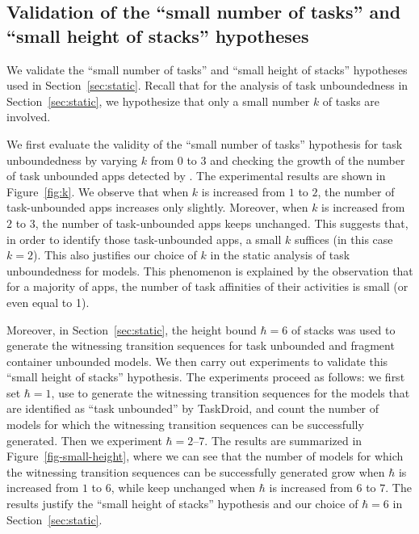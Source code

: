 
\subsection{Validation of the  ``small number of tasks''  and ``small height of stacks''  hypotheses} \label{sec:hyp}

We validate the ``small number of tasks''  and ``small height of stacks''  hypotheses used in Section~\ref{sec:static}.
%
Recall that for the analysis of task unboundedness in Section~\ref{sec:static},  we hypothesize that only a small number $k$ of tasks are involved. 

We first evaluate the validity of the ``small number of tasks'' hypothesis for task unboundedness by varying  $k$ from $0$ to $3$ and checking the growth of the number of task unbounded apps detected by {\tool}. 
The experimental results are shown in Figure~\ref{fig:k}.
We observe that when $k$ is increased from $1$ to $2$, the number of task-unbounded apps increases only slightly.
Moreover, when $k$ is increased from $2$ to $3$, the number of task-unbounded apps keeps unchanged.
This suggests that, in order to identify those task-unbounded apps, a small $k$ suffices (in this case $k=2$). This also justifies our choice of $k$ in the static analysis of task unboundedness for {\AMASS} models.  This phenomenon is explained by the observation that for a majority of apps, %
the number of task affinities of their activities is small (or even equal to 1).
%

Moreover, in Section~\ref{sec:static}, the height bound $\hbar = 6$ of stacks was used to generate the witnessing transition sequences for task unbounded and fragment container unbounded {\AMASS} models. We then carry out experiments to validate this ``small height of stacks'' hypothesis. 
The experiments proceed as follows: we first set $\hbar = 1$, use {\nuxmv} to generate the witnessing transition sequences for the  {\AMASS} models that are identified as ``task unbounded''  by TaskDroid, and count the number of models for which the witnessing transition sequences can be successfully generated. Then we experiment $\hbar=2$--$7$. %
The results are summarized in Figure~\ref{fig-small-height}, where we can see that the number of models for which the witnessing transition sequences can be successfully generated grow when $\hbar$ is increased from $1$ to $6$, while keep unchanged when $\hbar$ is increased from $6$ to $7$. The results justify the ``small height of stacks'' hypothesis and our choice of $\hbar = 6$ in Section~\ref{sec:static}. 


